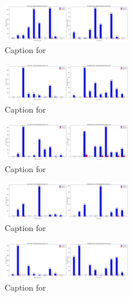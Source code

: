 \documentclass[12pt, a4paper]{article}
\begin{document}
\begin{figure}[ht]
\centering
\includegraphics[width=0.5\textwidth]{combined_class_boundary_pgd/combined_class_9_misclassifications_eps_0.2.png}
\caption{Caption for }
\label{fig:combined_class_9_misclassifications_eps_0.2.png}
\end{figure}

\begin{figure}[ht]
\centering
\includegraphics[width=0.5\textwidth]{combined_class_boundary_pgd/combined_class_1_misclassifications_eps_0.3.png}
\caption{Caption for }
\label{fig:combined_class_1_misclassifications_eps_0.3.png}
\end{figure}

\begin{figure}[ht]
\centering
\includegraphics[width=0.5\textwidth]{combined_class_boundary_pgd/combined_class_0_misclassifications_eps_0.3.png}
\caption{Caption for }
\label{fig:combined_class_0_misclassifications_eps_0.3.png}
\end{figure}

\begin{figure}[ht]
\centering
\includegraphics[width=0.5\textwidth]{combined_class_boundary_pgd/combined_class_3_misclassifications_eps_0.3.png}
\caption{Caption for }
\label{fig:combined_class_3_misclassifications_eps_0.3.png}
\end{figure}

\begin{figure}[ht]
\centering
\includegraphics[width=0.5\textwidth]{combined_class_boundary_pgd/combined_class_2_misclassifications_eps_0.3.png}
\caption{Caption for }
\label{fig:combined_class_2_misclassifications_eps_0.3.png}
\end{figure}
\end{document}
